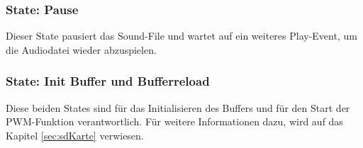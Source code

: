\subsubsection*{State: Pause}

Dieser State pausiert das Sound-File und wartet auf ein weiteres Play-Event, um die Audiodatei wieder abzuspielen.

\subsubsection*{State: Init Buffer und Bufferreload}
Diese beiden States sind für das Initialisieren des Buffers und für den Start der PWM-Funktion verantwortlich. Für weitere Informationen dazu, wird auf das Kapitel \ref{sec:sdKarte} verwiesen.